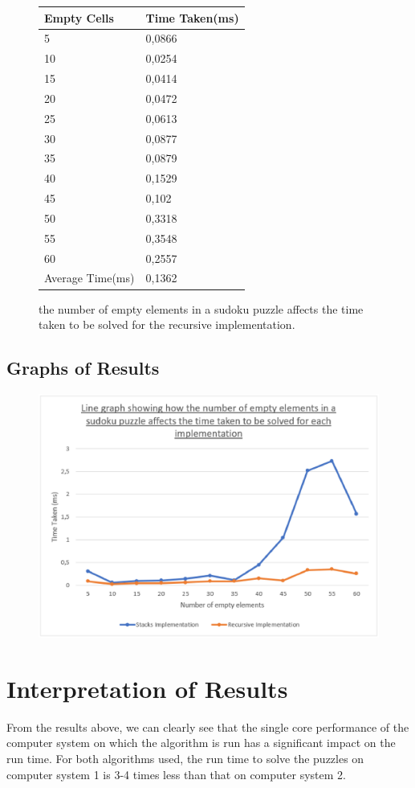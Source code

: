 \documentclass[11pt]{article}
\begin{document}
\begin{figure}[H]
\centering
\begin{tabular}{|l|l|}
\hline
Empty Cells & Time Taken(ms)\\
\hline
5	&0,0866\\
10&	0,0254\\
15&	0,0414\\
20&	0,0472\\
25&	0,0613\\
30&	0,0877\\
35&	0,0879\\
40&	0,1529\\
45&	0,102\\
50&	0,3318\\
55&	0,3548\\
60&	0,2557\\
\hline
Average Time(ms) & 0,1362\\
\hline
\end{tabular}
\caption{the number of empty elements in a sudoku puzzle affects the time taken to be solved for the recursive implementation.}
\end{figure}

\subsection{Graphs of Results}
\begin{figure}[H]
\centering
\includegraphics[scale=0.54]{fig12.eps}
\caption{ }
\end{figure}

\section{Interpretation of Results}
From the results above, we can clearly see that the single core performance of the computer system on which the algorithm is run has a significant impact on the run time. 
For both algorithms used, the run time to solve the 
puzzles on computer system 1 is 3-4 times less than that on computer system 2. 
\end{document}
